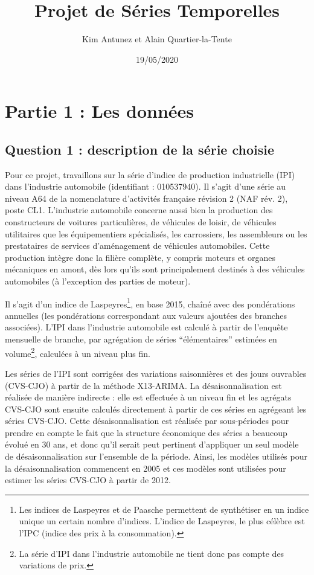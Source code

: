 \documentclass[]{article}
\title{Projet de Séries Temporelles}
\author{Kim Antunez et Alain Quartier-la-Tente}
\date{19/05/2020}
\let\rmarkdownfootnote\footnote%
\def\footnote{\protect\rmarkdownfootnote}
\begin{document}
\maketitle

{
\hypersetup{linkcolor=}
\setcounter{tocdepth}{3}
\tableofcontents
}
\hypertarget{partie-1-les-donnuxe9es}{%
\section{Partie 1 : Les données}\label{partie-1-les-donnuxe9es}}

\hypertarget{question-1-description-de-la-suxe9rie-choisie}{%
\subsection{Question 1 : description de la série choisie}\label{question-1-description-de-la-suxe9rie-choisie}}

Pour ce projet, travaillons sur la série d'indice de production industrielle (IPI) dans l'industrie automobile (identifiant : 010537940).
Il s'agit d'une série au niveau A64 de la nomenclature d'activités française révision 2 (NAF rév. 2), poste CL1.
L'industrie automobile concerne aussi bien la production des constructeurs de voitures particulières, de véhicules de loisir, de véhicules utilitaires que les équipementiers spécialisés, les carrossiers, les assembleurs ou les prestataires de services d'aménagement de véhicules automobiles.
Cette production intègre donc la filière complète, y compris moteurs et organes mécaniques en amont, dès lors qu'ils sont principalement destinés à des véhicules automobiles (à l'exception des parties de moteur).

Il s'agit d'un indice de Laspeyres\footnote{Les indices de Laspeyres et de Paasche permettent de synthétiser en un indice unique un certain nombre d'indices. L'indice de Laspeyres, le plus célèbre est l'IPC (indice des prix à la consommation).}, en base 2015, chaîné avec des pondérations annuelles (les pondérations correspondant aux valeurs ajoutées des branches associées).
L'IPI dans l'industrie automobile est calculé à partir de l'enquête mensuelle de branche, par agrégation de séries ``élémentaires'' estimées en volume\footnote{La série d'IPI dans l'industrie automobile ne tient donc pas compte des variations de prix.}, calculées à un niveau plus fin.

Les séries de l'IPI sont corrigées des variations saisonnières et des jours ouvrables (CVS-CJO) à partir de la méthode X13-ARIMA.
La désaisonnalisation est réalisée de manière indirecte : elle est effectuée à un niveau fin et les agrégats CVS-CJO sont ensuite calculés directement à partir de ces séries en agrégeant les séries CVS-CJO.
Cette désaisonnalisation est réalisée par sous-périodes pour prendre en compte le fait que la structure économique des séries a beaucoup évolué en 30 ans, et donc qu'il serait peut pertinent d'appliquer un seul modèle de désaisonnalisation sur l'ensemble de la période.
Ainsi, les modèles utilisés pour la désaisonnalisation commencent en 2005 et ces modèles sont utilisées pour estimer les séries CVS-CJO à partir de 2012.
\end{document}
